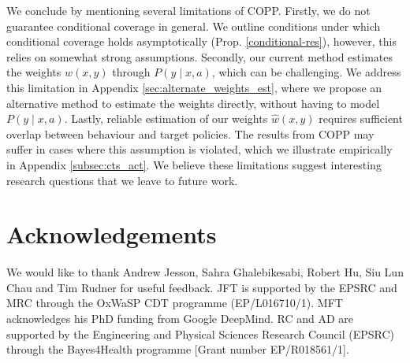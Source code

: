 We conclude by mentioning several limitations of COPP. 
Firstly, we do not guarantee conditional coverage in general.
We outline conditions under which conditional coverage holds asymptotically (Prop. \ref{conditional-res}), however, this relies on somewhat strong assumptions.
Secondly, our current method estimates the weights $w(x, y)$ through $P(y \mid x, a)$, which can be challenging.
We address this limitation in Appendix \ref{sec:alternate_weights_est}, where we propose an alternative method to estimate the weights directly, without having to model $P(y \mid x, a)$. %
Lastly, reliable estimation of our weights $\hat{w}(x, y)$ requires sufficient overlap between behaviour and target policies. The results from COPP may suffer in cases where this assumption is violated, which we illustrate empirically in Appendix \ref{subsec:cts_act}.
We believe these limitations suggest interesting research questions that we leave to future work.



\section*{Acknowledgements}
We would like to thank Andrew Jesson, Sahra Ghalebikesabi, Robert Hu, Siu Lun Chau and Tim Rudner for useful feedback.
JFT is supported by the EPSRC and MRC through the OxWaSP CDT programme (EP/L016710/1).
MFT acknowledges his PhD funding from Google DeepMind.
RC and AD are supported by the Engineering and Physical Sciences Research Council (EPSRC) through the Bayes4Health programme [Grant number EP/R018561/1].  

% 


